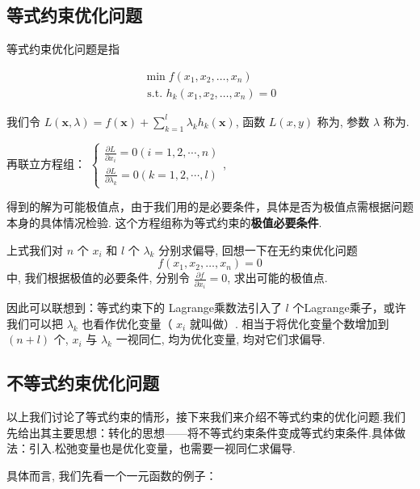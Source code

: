 \subsection{等式约束优化问题}

等式约束优化问题是指

\begin{problem}[等式约束优化问题]
    $$
\begin{array}{l}
\min f\left(x_{1}, x_{2}, \ldots, x_{n}\right) \\
\text { s.t. } h_{k}\left(x_{1}, x_{2}, \ldots, x_{n}\right)=0
\end{array}
$$
\end{problem}


我们令 $ L(\mathbf{x}, \lambda)=f(\mathbf{x})+\sum_{k=1}^{l} \lambda_{k} h_{k}(\mathbf{x}) $, 函数 $ L(x, y) $ 称为, 参数 $ \lambda $ 称为.

再联立方程组： $ \left\{\begin{array}{l}\frac{\partial L}{\partial x_{i}}=0(i=1,2, \cdots, n) \\ \frac{\partial L}{\partial \lambda_{k}}=0(k=1,2, \cdots, l)\end{array}\right. $,

得到的解为可能极值点，由于我们用的是必要条件，具体是否为极值点需根据问题本身的具体情况检验. 这个方程组称为等式约束的\textbf{极值必要条件}.

上式我们对 $ n $ 个 $ x_{i} $ 和 $ l $ 个 $ \lambda_{k} $ 分别求偏导, 回想一下在无约束优化问题 $$ f\left(x_{1}, x_{2}, \ldots, x_{n}\right)=0 $$ 中, 我们根据极值的必要条件, 分别令 $ \frac{\partial f}{\partial x_{i}}=0 $, 求出可能的极值点. 

因此可以联想到：等式约束下的 Lagrange乘数法引入了 $ l $ 个Lagrange乘子，或许我们可以把 $ \lambda_{k} $ 也看作优化变量（ $ x_{i} $ 就叫做）. 相当于将优化变量个数增加到 $ (n+l) $ 个, $ x_{i} $ 与 $ \lambda_{k} $ 一视同仁, 均为优化变量, 均对它们求偏导.

\subsection{不等式约束优化问题}

以上我们讨论了等式约束的情形，接下来我们来介绍不等式约束的优化问题.我们先给出其主要思想：转化的思想——将不等式约束条件变成等式约束条件.具体做法：引入.松弛变量也是优化变量，也需要一视同仁求偏导.

具体而言, 我们先看一个一元函数的例子：

